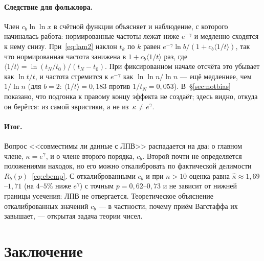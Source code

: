 \documentclass[11pt,a4paper]{article}
\theoremstyle{plain}
\theoremstyle{remark}
\newcommand{\Rb}{R_b}
\newcommand{\eg}{e^{\gamma}}
\newcommand{\emg}{e^{-\gamma}}
\begin{document}
\paragraph{Следствие для фольклора.} Член $c_b\ln\ln x$ в счётной функции объясняет
и наблюдение, с которого начиналась работа: нормированные частоты лежат ниже
$\emg$ и медленно сходятся к нему снизу. При~\eqref{eq:lam2} наклон $t_k$ по $k$
равен $\emg\ln b/(1+c_b\langle1/t\rangle)$, так что нормированная частота
занижена в $1+c_b\langle1/t\rangle$ раз, где
$\langle1/t\rangle=\ln(t_N/t_0)/(t_N-t_0)$. При фиксированном начале отсчёта это
убывает как $\ln t/t$, и частота стремится к $\emg$ как $\ln\ln n/\ln n$ --- ещё
медленнее, чем $1/\ln n$ (для $b=2$: $\langle1/t\rangle=0{,}183$ против
$1/t_N=0{,}053$). В~\S\ref{sec:notbias} показано, что
подгонка к правому концу эффекта не создаёт; здесь видно, откуда он берётся:
из самой эвристики, а не из~$\kappa\ne\eg$.

\paragraph{Итог.} Вопрос <<совместимы ли данные с ЛПВ>> распадается на два:
о главном члене, $\kappa=\eg$, и о члене второго порядка, $c_b$. Второй почти не
определяется положениями находок, но его можно откалибровать по фактической
делимости $\Rb(p)$~\eqref{eq:cbemp}. С откалиброванными $c_b$ и при $n>10$ оценка
равна $\hat\kappa\approx1{,}69$--$1{,}71$ (на $4$--$5\%$ ниже $\eg$) с точным
$p=0{,}62$--$0{,}73$ и не зависит от нижней границы усечения: ЛПВ не
отвергается. Теоретическое объяснение откалиброванных значений $c_b$ --- в частности,
почему приём Вагстаффа их завышает, --- открытая задача теории чисел.

\section{Заключение}
\end{document}
